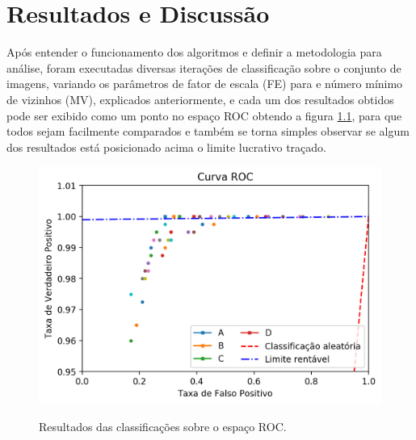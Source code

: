 \chapter{Resultados e Discussão}\label{cap:resultados}

Após entender o funcionamento dos algoritmos e definir a metodologia para análise, foram executadas diversas iterações de classificação sobre o conjunto de imagens, variando os parâmetros de fator de escala (FE) para e número mínimo de vizinhos (MV), explicados anteriormente, e cada um dos resultados obtidos pode ser exibido como um ponto no espaço ROC obtendo a figura \ref{fig:results_roc}, para que todos sejam facilmente comparados e também se torna simples observar se algum dos resultados está posicionado acima o limite lucrativo traçado.

\begin{figure}[htbp]
     \centering
     \caption{Resultados das classificações sobre o espaço ROC.}
     \includegraphics[scale=1]{figs/curva_roc_results.png}
     \label{fig:results_roc}
 \end{figure}

